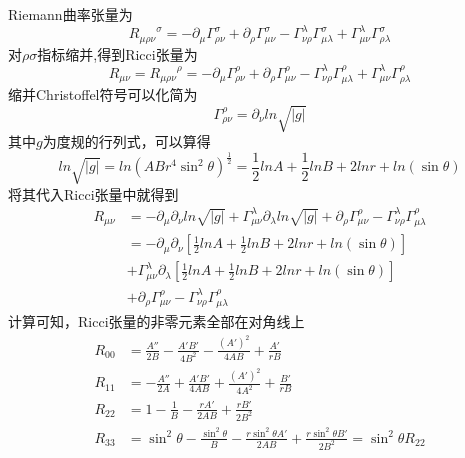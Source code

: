         Riemann曲率张量为
        \begin{equation}
            {R_{\mu\rho\nu}}^\sigma=-\partial_\mu\Gamma^\sigma_{\rho\nu}+\partial_\rho\Gamma^\sigma_{\mu\nu}-\Gamma^\lambda_{\nu\rho}\Gamma^\sigma_{\mu\lambda}+\Gamma^\lambda_{\mu\nu}\Gamma^\sigma_{\rho\lambda}
        \end{equation}
        对$\rho\sigma$指标缩并,得到Ricci张量为
        \begin{equation}
            R_{\mu\nu}={R_{\mu\rho\nu}}^\rho=-\partial_\mu\Gamma^\rho_{\rho\nu}+\partial_\rho\Gamma^\rho_{\mu\nu}-\Gamma^\lambda_{\nu\rho}\Gamma^\rho_{\mu\lambda}+\Gamma^\lambda_{\mu\nu}\Gamma^\rho_{\rho\lambda}
        \end{equation}
        缩并Christoffel符号可以化简为
        \begin{equation}
            \Gamma^\rho_{\rho\nu}=\partial_\nu ln\sqrt{|g|}
        \end{equation}
        其中$g$为度规的行列式，可以算得
        \begin{equation}
            ln\sqrt{|g|}=ln(ABr^4\sin^2\theta)^\frac{1}{2}=\frac{1}{2}lnA+\frac{1}{2}lnB+2lnr+ln(\sin\theta)
        \end{equation}
        将其代入Ricci张量中就得到
        \begin{equation}
            \begin{split}
                    R_{\mu\nu}&=-\partial_\mu\partial_\nu ln\sqrt{|g|}+\Gamma^\lambda_{\mu\nu}\partial_\lambda ln\sqrt{|g|}+\partial_\rho\Gamma^\rho_{\mu\nu}-\Gamma^\lambda_{\nu\rho}\Gamma^\rho_{\mu\lambda}\\
                    &=-\partial_\mu\partial_\nu \left[\frac{1}{2}lnA+\frac{1}{2}lnB+2lnr+ln(\sin\theta)\right]\\
                    &+\Gamma^\lambda_{\mu\nu}\partial_\lambda \left[\frac{1}{2}lnA+\frac{1}{2}lnB+2lnr+ln(\sin\theta)\right]\\
                    &+\partial_\rho\Gamma^\rho_{\mu\nu}-\Gamma^\lambda_{\nu\rho}\Gamma^\rho_{\mu\lambda}
            \end{split}
        \end{equation}
        计算可知，Ricci张量的非零元素全部在对角线上
        \begin{equation}
            \begin{split}
                    R_{00}&=\frac{A''}{2B}-\frac{A'B'}{4B^2}-\frac{(A')^2}{4AB}+\frac{A'}{rB}\\
                    R_{11}&=-\frac{A''}{2A}+\frac{A'B'}{4AB}+\frac{(A')^2}{4A^2}+\frac{B'}{rB}\\
                    R_{22}&=1-\frac{1}{B}-\frac{rA'}{2AB}+\frac{rB'}{2B^2}\\
                    R_{33}&=\sin^2\theta-\frac{\sin^2\theta}{B}-\frac{r\sin^2\theta A'}{2AB}+\frac{r\sin^2\theta B'}{2B^2}=\sin^2\theta R_{22}
            \end{split}
        \end{equation}
